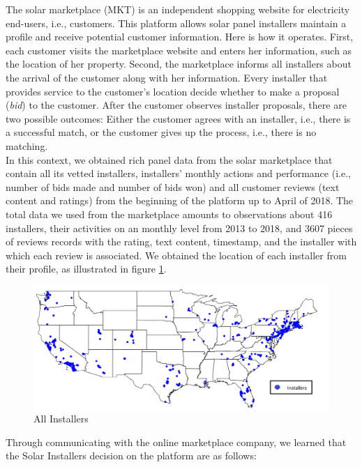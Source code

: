 \documentclass[msom,blindrev]{informs3}
\begin{document}
The solar marketplace (MKT) is an independent shopping website for electricity end-users, i.e., customers. This platform allows solar panel installers maintain a profile and receive potential customer information. Here is how it operates. First, each customer visits the marketplace website and enters her information, such as the location of her property. Second, the marketplace informs all installers about the arrival of the customer along with her information. Every installer that provides service to the customer's location decide whether to make a proposal (\emph{bid}) to the customer. After the customer observes installer proposals, there are two possible outcomes: Either the customer agrees with an installer, i.e., there is a successful match, or the customer gives up the process, i.e., there is no matching. \\
In this context, we obtained rich panel data from the solar marketplace that contain all its vetted installers, installers' monthly actions and performance (i.e., number of bids made and number of bids won) and all customer reviews (text content and ratings) from the beginning of the platform up to April of 2018. The total data we used from the marketplace amounts to observations about 416 installers, their activities on an monthly level from 2013 to 2018, and 3607 pieces of reviews records with the rating, text content, timestamp, and the installer with which each review is associated. We obtained the location of each installer from their profile, as illustrated in figure \ref{fig:nationalinstallers}. 
\begin{figure}
	\centering
	\includegraphics[width=1.1\linewidth]{national_installers.png}
	\caption{All Installers}
	\label{fig:nationalinstallers}
\end{figure}
 

 
Through communicating with the online marketplace company, we learned that the Solar Installers decision on the platform are as follows:
\end{document}
